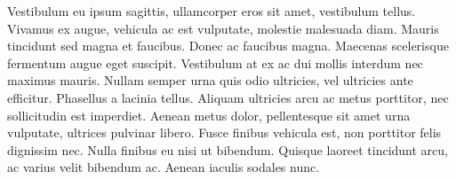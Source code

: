 Vestibulum eu ipsum sagittis, ullamcorper eros sit amet, vestibulum tellus. Vivamus ex augue, vehicula ac est vulputate, molestie malesuada diam. Mauris tincidunt sed magna et faucibus. Donec ac faucibus magna. Maecenas scelerisque fermentum augue eget suscipit. Vestibulum at ex ac dui mollis interdum nec maximus mauris. Nullam semper urna quis odio ultricies, vel ultricies ante efficitur. Phasellus a lacinia tellus. Aliquam ultricies arcu ac metus porttitor, nec sollicitudin est imperdiet. Aenean metus dolor, pellentesque sit amet urna vulputate, ultrices pulvinar libero. Fusce finibus vehicula est, non porttitor felis dignissim nec. Nulla finibus eu nisi ut bibendum. Quisque laoreet tincidunt arcu, ac varius velit bibendum ac. Aenean iaculis sodales nunc. 
